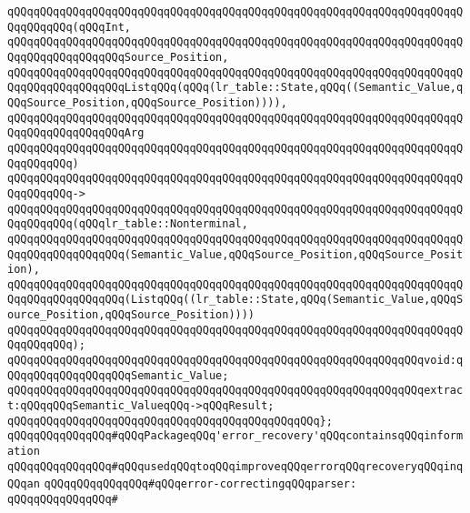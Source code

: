 \verb|qQQqqQQqqQQqqQQqqQQqqQQqqQQqqQQqqQQqqQQqqQQqqQQqqQQqqQQqqQQqqQQqqQQqqQQqqQQqqQQq(qQQqInt,|\newline
\verb|qQQqqQQqqQQqqQQqqQQqqQQqqQQqqQQqqQQqqQQqqQQqqQQqqQQqqQQqqQQqqQQqqQQqqQQqqQQqqQQqqQQqqQQqSource_Position,|\newline
\verb|qQQqqQQqqQQqqQQqqQQqqQQqqQQqqQQqqQQqqQQqqQQqqQQqqQQqqQQqqQQqqQQqqQQqqQQqqQQqqQQqqQQqqQQqListqQQq(qQQq(lr_table::State,qQQq((Semantic_Value,qQQqSource_Position,qQQqSource_Position)))),|\newline
\verb|qQQqqQQqqQQqqQQqqQQqqQQqqQQqqQQqqQQqqQQqqQQqqQQqqQQqqQQqqQQqqQQqqQQqqQQqqQQqqQQqqQQqqQQqArg|\newline
\verb|qQQqqQQqqQQqqQQqqQQqqQQqqQQqqQQqqQQqqQQqqQQqqQQqqQQqqQQqqQQqqQQqqQQqqQQqqQQqqQQq)|\newline
\verb|qQQqqQQqqQQqqQQqqQQqqQQqqQQqqQQqqQQqqQQqqQQqqQQqqQQqqQQqqQQqqQQqqQQqqQQqqQQqqQQq->|\newline
\verb|qQQqqQQqqQQqqQQqqQQqqQQqqQQqqQQqqQQqqQQqqQQqqQQqqQQqqQQqqQQqqQQqqQQqqQQqqQQqqQQq(qQQqlr_table::Nonterminal,|\newline
\verb|qQQqqQQqqQQqqQQqqQQqqQQqqQQqqQQqqQQqqQQqqQQqqQQqqQQqqQQqqQQqqQQqqQQqqQQqqQQqqQQqqQQqqQQq(Semantic_Value,qQQqSource_Position,qQQqSource_Position),|\newline
\verb|qQQqqQQqqQQqqQQqqQQqqQQqqQQqqQQqqQQqqQQqqQQqqQQqqQQqqQQqqQQqqQQqqQQqqQQqqQQqqQQqqQQqqQQq(ListqQQq((lr_table::State,qQQq(Semantic_Value,qQQqSource_Position,qQQqSource_Position))))|\newline
\verb|qQQqqQQqqQQqqQQqqQQqqQQqqQQqqQQqqQQqqQQqqQQqqQQqqQQqqQQqqQQqqQQqqQQqqQQqqQQqqQQq);|\newline
\newline
\verb|qQQqqQQqqQQqqQQqqQQqqQQqqQQqqQQqqQQqqQQqqQQqqQQqqQQqqQQqqQQqqQQqvoid:qQQqqQQqqQQqqQQqqQQqSemantic_Value;|\newline
\verb|qQQqqQQqqQQqqQQqqQQqqQQqqQQqqQQqqQQqqQQqqQQqqQQqqQQqqQQqqQQqqQQqextract:qQQqqQQqSemantic_ValueqQQq->qQQqResult;|\newline
\verb|qQQqqQQqqQQqqQQqqQQqqQQqqQQqqQQqqQQqqQQqqQQqqQQq};|\newline
\newline
\verb|qQQqqQQqqQQqqQQq#qQQqPackageqQQq'error_recovery'qQQqcontainsqQQqinformation|\newline
\verb|qQQqqQQqqQQqqQQq#qQQqusedqQQqtoqQQqimproveqQQqerrorqQQqrecoveryqQQqinqQQqan|\newline
\verb|qQQqqQQqqQQqqQQq#qQQqerror-correctingqQQqparser:|\newline
\verb|qQQqqQQqqQQqqQQq#|\newline
